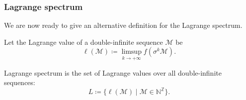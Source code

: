 \begin{frame}
\frametitle{Lagrange spectrum}

We are now ready to give an alternative definition for the Lagrange spectrum.

\begin{definition}
	Let the Lagrange value of a double-infinite sequence $\mathcal{M}$ be
	\begin{equation*}
		\ell(\mathcal{M})
		\coloneqq \limsup\limits_{k \rightarrow + \infty} f(\sigma^k \mathcal{M}).
	\end{equation*}
\end{definition}

\begin{definition}
	Lagrange spectrum is the set of Lagrange values over all double-infinite sequences:
	\begin{equation*}
		L \coloneqq \{ \ell(\mathcal{M}) \mid
		\mathcal{M} \in \mathbb{N}^\mathbb{Z} \}.
	\end{equation*}
\end{definition}

\end{frame}
